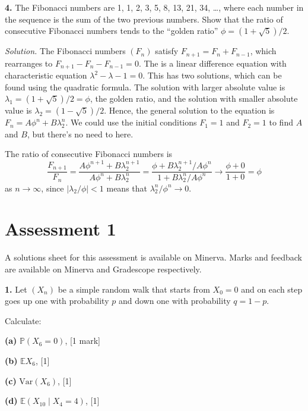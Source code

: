 \documentclass[
  a4paper,
]{article}
\theoremstyle{definition}
\theoremstyle{definition}
\theoremstyle{definition}
\theoremstyle{remark}
\begin{document}
\textbf{4.} The Fibonacci numbers are 1, 1, 2, 3, 5, 8, 13, 21, 34, \ldots, where each number in the sequence is the sum of the two previous numbers. Show that the ratio of consecutive Fibonacci numbers tends to the ``golden ratio'' \(\phi = (1 + \sqrt{5})/2\).

\begin{myanswers}
\emph{Solution.} The Fibonacci numbers \((F_n)\) satisfy \(F_{n+1} = F_n + F_{n-1}\), which rearranges to \(F_{n+1} -F_n - F_{n-1} = 0\). The is a linear difference equation with characteristic equation \(\lambda^2 - \lambda - 1 = 0\). This has two solutions, which can be found using the quadratic formula. The solution with larger absolute value is \(\lambda_1 = (1+\sqrt{5})/2 = \phi\), the golden ratio, and the solution with smaller absolute value is \(\lambda_2 = (1-\sqrt{5})/2\). Hence, the general solution to the equation is \(F_n = A\phi^n + B\lambda_2^n\). We could use the initial conditions \(F_1 = 1\) and \(F_2 = 1\) to find \(A\) and \(B\), but there's no need to here.

The ratio of consecutive Fibonacci numbers is
\[ \frac{F_{n+1}}{F_n} = \frac{A\phi^{n+1} + B\lambda_2^{n+1}}{A\phi^n + B\lambda_2^n} = \frac{\phi + B\lambda_2^{n+1}/A\phi^n}{1 + B\lambda_2^n/A\phi^n} \to \frac{\phi + 0}{1 + 0} = \phi \]
as \(n \to \infty\), since \(|\lambda_2/\phi| < 1\) means that \(\lambda_2^n / \phi^n \to 0\).

\end{myanswers}

\hypertarget{A1}{%
\section*{Assessment 1}\label{A1}}

A solutions sheet for this assessment is available on Minerva. Marks and feedback are available on Minerva and Gradescope respectively.

\textbf{1.} Let \((X_n)\) be a simple random walk that starts from \(X_0 = 0\) and on each step goes up one with probability \(p\) and down one with probability \(q = 1-p\).

Calculate:

\textbf{(a)} \(\mathbb P(X_6 = 0)\), {{[}1 mark{]}}

\textbf{(b)} \(\mathbb EX_6\), {{[}1{]}}

\textbf{(c)} \(\text{Var}(X_6)\), {{[}1{]}}

\textbf{(d)} \(\mathbb E(X_{10} \mid X_4 = 4)\), {{[}1{]}}
\end{document}
